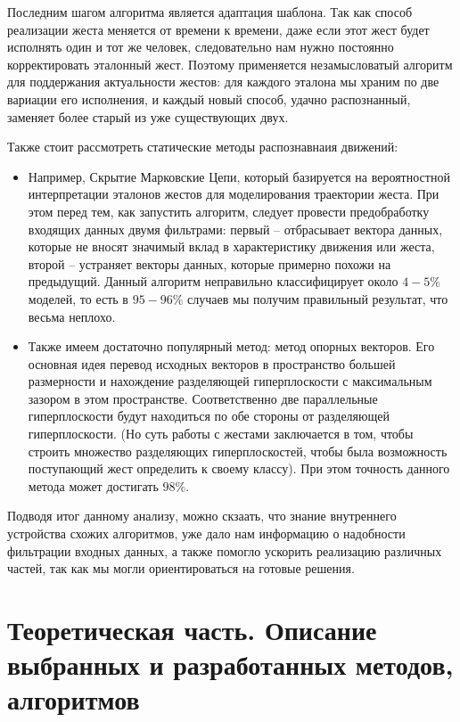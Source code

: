 Последним шагом алгоритма является адаптация шаблона. Так как способ реализации жеста меняется от времени к времени, даже если этот жест будет исполнять один и тот же человек, следовательно нам нужно постоянно корректировать эталонный жест. Поэтому применяется незамысловатый алгоритм для поддержания актуальности жестов: для каждого эталона мы храним по две вариации его исполнения, и каждый новый способ, удачно распознанный, заменяет более старый из уже существующих двух.

Также стоит рассмотреть статические методы распознавнаия движений:
\begin{itemize}
    \item Например, Скрытие Марковские Цепи, который базируется на вероятностной интерпретации эталонов жестов для моделирования траектории жеста. При этом перед тем, как запустить алгоритм, следует провести предобработку входящих данных двумя фильтрами: первый -- отбрасывает вектора данных, которые не вносят значимый вклад в характеристику движения или жеста, второй – устраняет векторы данных, которые примерно похожи на предыдущий. Данный алгоритм неправильно классифицирует около $4-5 \%$ моделей, то есть в $95-96 \%$  случаев мы получим правильный результат, что весьма неплохо.
    \item Также имеем достаточно популярный метод: метод опорных векторов. Его основная идея перевод исходных векторов в пространство большей размерности и нахождение разделяющей гиперплоскости с максимальным зазором в этом пространстве. Соответственно две параллельные гиперплоскости будут находиться по обе стороны от разделяющей гиперплоскости. (Но суть работы с жестами заключается в том, чтобы строить множество разделяющих гиперплоскостей, чтобы была возможность поступающий жест определить к своему классу). При этом точность данного метода может достигать $98 \%$.
\end{itemize}

Подводя итог данному анализу, можно скзаать, что знание внутреннего устройства схожих алгоритмов, уже дало нам информацию о надобности фильтрации входных данных, а также помогло ускорить реализацию различных частей, так как мы могли ориентироваться на готовые решения.

\section{Теоретическая часть. Описание выбранных и разработанных методов, алгоритмов}